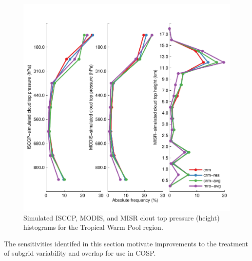 \documentclass[letter]{article}
\begin{document}
\begin{figure}
\centering
\includegraphics{all_cth.pdf}
\caption{Simulated ISCCP, MODIS, and MISR clout top pressure (height) histograms for the Tropical Warm Pool region.}
\label{all_cth}
\end{figure}

The sensitivities identifed in this section motivate improvements to the treatment of subgrid variability and overlap for use in COSP.
\end{document}
